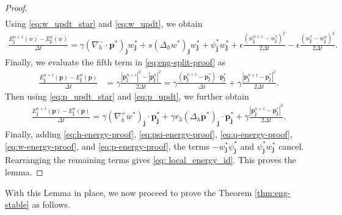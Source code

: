 \documentclass[11pt]{article}
\numberwithin{equation}{section}
\newtheorem{counter example}[theorem]{Counter Example}
\numberwithin{equation}{section}
\numberwithin{equation}{section}
\begin{document}
\begin{proof}
\begin{align*}
\end{align*}
Using \eqref{eq:w_updt_star} and \eqref{eq:w_updt}, we obtain
\begin{equation}
\begin{aligned}
\label{eq:w-energy-proof}
\frac{E_{\mathbf{j}}^{n+1}(w)-E_{\mathbf{j}}^{n}(w)}{\Delta t}=\gamma(\nabla_h^{-} \cdot \mathbf{p}^*)_{\mathbf{j}}w^*_{\mathbf{j}}+ s(\Delta_{h}w^*)_{\mathbf{j}}w^*_{\mathbf{j}}+\psi^*_{\mathbf{j}}w_{\mathbf{j}}^*+\epsilon\frac{(w_{\mathbf{j}}^{n+1}-w_{\mathbf{j}}^{*})^2}{2\Delta t}-\epsilon\frac{(w_{\mathbf{j}}^{*}-w_{\mathbf{j}}^{n})^2}{2\Delta t}.
\end{aligned}
\end{equation}
Finally, we evaluate the fifth term in \eqref{eq:eng-split-proof} as
\begin{align*}
\frac{E_{\mathbf{j}}^{n+1}(\mathbf{p})-E_{\mathbf{j}}^{n}(\mathbf{p})}{\Delta t}&=\gamma\frac{|\mathbf{p}_{\mathbf{j}}^{n+1}|^2-|\mathbf{p}_{\mathbf{j}}^{n}|^2}{2\Delta t}=\gamma\frac{(\mathbf{p}_{\mathbf{j}}^{n+1}-\mathbf{p}_{\mathbf{j}}^{*})\cdot \mathbf{p}_{\mathbf{j}}^{*}}{\Delta t}+\gamma\frac{|\mathbf{p}_{\mathbf{j}}^{n+1}-\mathbf{p}_{\mathbf{j}}^{*}|^2}{2\Delta t}.
\end{align*}
Then using \eqref{eq:p_updt_star} and \eqref{eq:p_updt}, we further obtain
\begin{equation}
\begin{aligned}
\label{eq:p-energy-proof}
\frac{E_{\mathbf{j}}^{n+1}(\mathbf{p})-E_{\mathbf{j}}^{n}(\mathbf{p})}{\Delta t}=\gamma(\nabla_h^+ w^*)_{\mathbf{j}}\cdot \mathbf{p}^*_{\mathbf{j}}+ \gamma r_3(\Delta_h \mathbf{p}^*)_{\mathbf{j}}\cdot \mathbf{p}^*_{\mathbf{j}}+\gamma\frac{|\mathbf{p}_{\mathbf{j}}^{n+1}-\mathbf{p}_{\mathbf{j}}^{*}|^2}{2\Delta t}.
\end{aligned}
\end{equation}
Finally, adding \eqref{eq:h-energy-proof}, \eqref{eq:psi-energy-proof}, \eqref{eq:q-energy-proof}, \eqref{eq:w-energy-proof}, and \eqref{eq:p-energy-proof}, the terms $-w_{\mathbf{j}}^*\psi^*_{\mathbf{j}}$ and $\psi^*_{\mathbf{j}}w_{\mathbf{j}}^*$ cancel. Rearranging the remaining
terms gives \eqref{eq: local_energy_id}. This proves the lemma.
\end{proof}
With this Lemma in place, we now proceed to prove the Theorem  \ref{thm:eng-stable} as follows.
\end{document}
